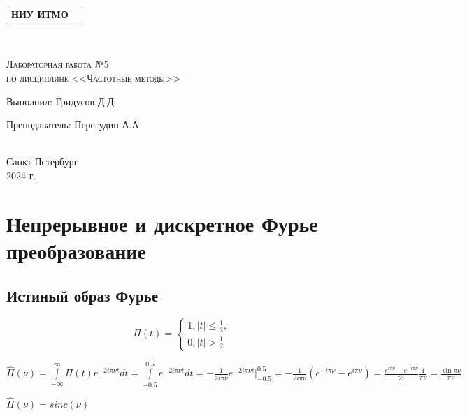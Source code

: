 


\begin{titlepage}
    \newpage
    \begin{center}
        \begin{tabular}{cc}
            \parbox{12cm}{\centering \textbf{НИУ ИТМО}} \\
            \\
            \hline
            \hline
        \end{tabular}
    \end{center}

    \begin{center}
        \\
    \end{center}

    \vspace{1cm}

    \begin{center}
        \textsc{Лабораторная работа №5 \\ по дисциплине <<Частотные методы>>}
    \end{center}

    \vspace{8em}

    \noindent Выполнил:  \hfill Гридусов Д.Д

    \vspace{20pt}
    \noindent Преподаватель: \hfill Перегудин А.А \\
    \\
    \vfill
    \begin{center}
        Санкт-Петербург \\2024 г.
    \end{center}

\end{titlepage}

\tableofcontents
\newpage

\section{Непрерывное и дискретное Фурье преобразование}
\subsection{Истиный образ Фурье}
\[
    \Pi(t) =  \begin{cases}
        1, |t| \leq \frac{1}{2}, \\
        0, |t| > \frac{1}{2}
    \end{cases}
\]
\begin{center}
    $\hat{\Pi}(\nu) = \int\limits_{-\infty}^{\infty}\Pi(t)e^{-2i\pi \nu t}dt
        = \int\limits_{-0.5}^{0.5}e^{-2i\pi \nu t}dt
        = -\frac{1}{2i\pi \nu}e^{-2i\pi \nu t}|_{-0.5}^{0.5}
        = -\frac{1}{2i\pi\nu}(e^{-i\pi\nu} - e^{i\pi\nu})
        = \frac{e^{i\pi\nu} - e^{-i\pi\nu}}{2i} \frac{1}{\pi \nu}
        = \frac{\sin\pi\nu}{\pi\nu}$
\end{center}
\begin{center}
    $\hat{\Pi}(\nu) = sinc(\nu)$
\end{center}

